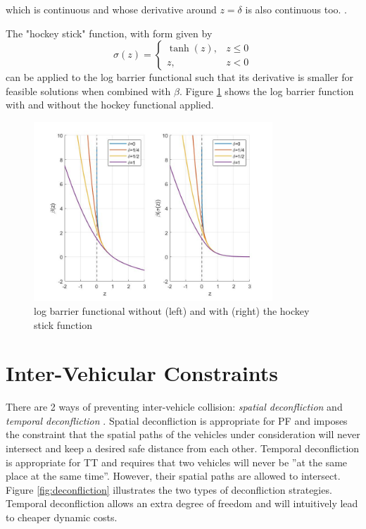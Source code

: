 which is continuous and whose derivative around $z=\delta$ is also continuous too. \cite{hauser2006barrier}.
\par The "hockey stick" function, with form given by
\begin{equation}
    \sigma(z)= \begin{cases}
        \tanh(z), & z\leq 0 \\
        z, & z<0
    \end{cases}
\end{equation}
can be applied to the log barrier functional such that its derivative is smaller for feasible solutions when combined with $\beta$. Figure \ref{fig:logbarrierfunc} shows the log barrier function with and without the hockey functional applied.

\begin{figure}
\centering
\includegraphics[width=0.8\textwidth]{Images/logbarrierfunc.jpg}
\caption{log barrier functional without (left) and with (right) the hockey stick function}
\label{fig:logbarrierfunc}
\end{figure}

\section{Inter-Vehicular Constraints}
\label{sec:mindistintveh}

\par There are 2 ways of preventing inter-vehicle collision: \textit{spatial deconfliction} and \textit{temporal deconfliction} \cite{hausler2015mission}.
Spatial deconfliction is appropriate for \ac{PF} and imposes the constraint that the spatial paths of the vehicles under consideration will never intersect and keep a desired safe distance from each other. Temporal deconfliction is appropriate for \ac{TT} and requires that two vehicles will never be ”at the same place at the same time”. However, their spatial paths are allowed to intersect. Figure \ref{fig:deconfliction} illustrates the two types of deconfliction strategies. Temporal deconfliction allows an extra degree of freedom and will intuitively lead to cheaper dynamic costs.


